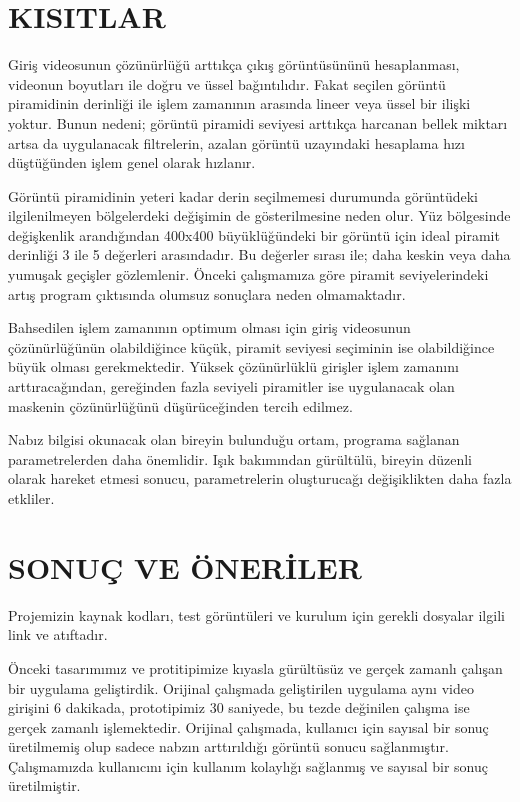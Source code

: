 \documentclass[a4paper, 12pt]{article}
\begin{document}
\newpage
\section{KISITLAR}\label{sec:kisitlar}

Giriş videosunun çözünürlüğü arttıkça çıkış görüntüsününü hesaplanması, videonun boyutları ile doğru ve üssel bağıntılıdır. Fakat seçilen görüntü piramidinin derinliği ile işlem zamanının arasında lineer veya üssel bir ilişki yoktur. Bunun nedeni; görüntü piramidi seviyesi arttıkça harcanan bellek miktarı artsa da uygulanacak filtrelerin, azalan görüntü uzayındaki hesaplama hızı düştüğünden işlem genel olarak hızlanır.

Görüntü piramidinin yeteri kadar derin seçilmemesi durumunda görüntüdeki ilgilenilmeyen bölgelerdeki değişimin de gösterilmesine neden olur. Yüz bölgesinde değişkenlik arandığından 400x400 büyüklüğündeki bir görüntü için ideal piramit derinliği 3 ile 5 değerleri arasındadır. Bu değerler sırası ile; daha keskin veya daha yumuşak geçişler gözlemlenir. Önceki çalışmamıza göre piramit seviyelerindeki artış program çıktısında olumsuz sonuçlara neden olmamaktadır.

Bahsedilen işlem zamanının optimum olması için giriş videosunun çözünürlüğünün olabildiğince küçük, piramit seviyesi seçiminin ise olabildiğince büyük olması gerekmektedir. Yüksek çözünürlüklü girişler işlem zamanını arttıracağından, gereğinden fazla seviyeli piramitler ise uygulanacak olan maskenin çözünürlüğünü düşürüceğinden tercih edilmez.

Nabız bilgisi okunacak olan bireyin bulunduğu ortam, programa sağlanan parametrelerden daha önemlidir. Işık bakımından gürültülü, bireyin düzenli olarak hareket etmesi sonucu, parametrelerin oluşturucağı değişiklikten daha fazla etkliler.


\newpage

\section{SONUÇ VE ÖNERİLER}{\label{sonuclar}}

Projemizin kaynak kodları, test görüntüleri ve kurulum için gerekli dosyalar ilgili link ve atıftadır.\cite{kod_bizim} 

Önceki tasarımımız ve protitipimize kıyasla gürültüsüz ve gerçek zamanlı çalışan bir uygulama geliştirdik. Orijinal çalışmada geliştirilen uygulama aynı video girişini 6 dakikada, prototipimiz 30 saniyede, bu tezde değinilen çalışma ise gerçek zamanlı işlemektedir. Orijinal çalışmada, kullanıcı için sayısal bir sonuç üretilmemiş olup sadece nabzın arttırıldığı görüntü sonucu sağlanmıştır. Çalışmamızda kullanıcını için kullanım kolaylığı sağlanmış ve sayısal bir sonuç üretilmiştir. 
\end{document}
